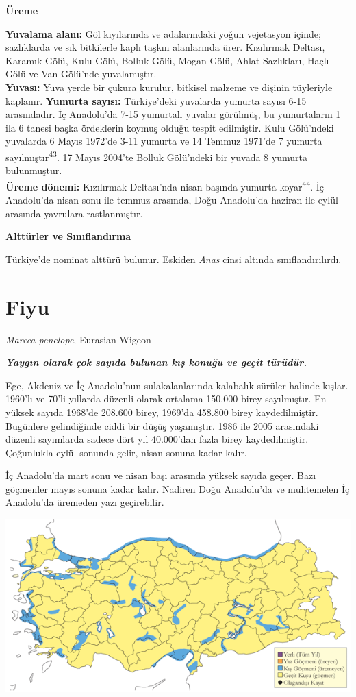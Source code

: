 \documentclass[
  letterpaper,
  DIV=11,
  numbers=noendperiod]{scrreprt}
\begin{document}
\textbf{Üreme}

\textbf{Yuvalama alanı:} Göl kıyılarında ve adalarındaki yoğun
vejetasyon içinde; sazlıklarda ve sık bitkilerle kaplı taşkın
alanlarında ürer. Kızılırmak Deltası, Karamık Gölü, Kulu Gölü, Bolluk
Gölü, Mogan Gölü, Ahlat Sazlıkları, Haçlı Gölü ve Van Gölü'nde
yuvalamıştır.\\
\textbf{Yuvası:} Yuva yerde bir çukura kurulur, bitkisel malzeme ve
dişinin tüyleriyle kaplanır. \textbf{\hfill\break
Yumurta sayısı:} Türkiye'deki yuvalarda yumurta sayısı 6-15 arasındadır.
İç Anadolu'da 7-15 yumurtalı yuvalar görülmüş, bu yumurtaların 1 ila 6
tanesi başka ördeklerin koymuş olduğu tespit edilmiştir. Kulu Gölü'ndeki
yuvalarda 6 Mayıs 1972'de 3-11 yumurta ve 14 Temmuz 1971'de 7 yumurta
sayılmıştır\textsuperscript{43}. 17 Mayıs 2004'te Bolluk Gölü'ndeki bir
yuvada 8 yumurta bulunmuştur.\\
\textbf{Üreme dönemi:} Kızılırmak Deltası'nda nisan başında yumurta
koyar\textsuperscript{44}. İç Anadolu'da nisan sonu ile temmuz arasında,
Doğu Anadolu'da haziran ile eylül arasında yavrulara rastlanmıştır.

\textbf{Alttürler ve Sınıflandırma}

Türkiye'de nominat alttürü bulunur. Eskiden \emph{Anas} cinsi altında
sınıflandırılırdı.

\section{Fiyu}\label{fiyu}

\emph{Mareca penelope}, Eurasian Wigeon

\textbf{\emph{Yaygın olarak çok sayıda bulunan kış konuğu ve geçit
türüdür.}}

Ege, Akdeniz ve İç Anadolu'nun sulakalanlarında kalabalık sürüler
halinde kışlar. 1960'lı ve 70'li yıllarda düzenli olarak ortalama
150.000 birey sayılmıştır. En yüksek sayıda 1968'de 208.600 birey,
1969'da 458.800 birey kaydedilmiştir. Bugünlere gelindiğinde ciddi bir
düşüş yaşamıştır. 1986 ile 2005 arasındaki düzenli sayımlarda sadece
dört yıl 40.000'dan fazla birey kaydedilmiştir. Çoğunlukla eylül sonunda
gelir, nisan sonuna kadar kalır.

İç Anadolu'da mart sonu ve nisan başı arasında yüksek sayıda geçer. Bazı
göçmenler mayıs sonuna kadar kalır. Nadiren Doğu Anadolu'da ve
muhtemelen İç Anadolu'da üremeden yazı geçirebilir.

\includegraphics{images/harita_Page_015.png}
\end{document}
